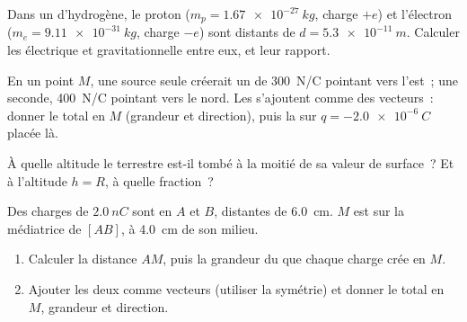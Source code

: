 \begin{exercise}[$\star\star$]\label{exo:g11:electric-gravitational-fields:10}
Dans un  d'hydrogène, le proton
($m_p = \qty{1.67e-27}{kg}$, charge $+e$) et l'électron
($m_e = \qty{9.11e-31}{kg}$, charge $-e$) sont distants de
$d = \qty{5.3e-11}{m}$. Calculer les
 électrique et gravitationnelle entre
eux, et leur rapport.
\end{exercise}

\begin{exercise}[$\star\star$]\label{exo:g11:electric-gravitational-fields:11}
En un point $M$, une source seule créerait un
 de \qty{300}{N/C} pointant vers
l'est~; une seconde, \qty{400}{N/C} pointant vers le nord. Les
 s'ajoutent comme des
vecteurs~: donner le  total en
$M$ (grandeur et direction), puis la
 sur $q = \qty{-2.0e-6}{C}$ placée
là.
\end{exercise}

\begin{exercise}[$\star\star\star$]\label{exo:g11:electric-gravitational-fields:12}
À quelle altitude le  terrestre
est-il tombé à la moitié de sa valeur de surface~? Et à l'altitude
$h = R$, à quelle fraction~?
\end{exercise}

\begin{exercise}[$\star\star\star$]\label{exo:g11:electric-gravitational-fields:13}
Des charges de $\qty{+2.0}{nC}$ sont en $A$ et $B$, distantes de
\qty{6.0}{cm}. $M$ est sur la médiatrice de $[AB]$, à \qty{4.0}{cm} de
son milieu.
\begin{enumerate}
  \item Calculer la distance $AM$, puis la grandeur du
         que chaque charge crée
        en $M$.
  \item Ajouter les deux
         comme vecteurs (utiliser
        la symétrie) et donner le
         total en $M$, grandeur et
        direction.
\end{enumerate}
\end{exercise}

